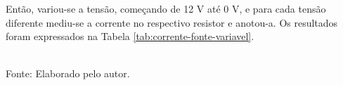 \documentclass[12pt]{article}
\begin{document}
Então, variou-se a tensão, começando de 12 V até 0 V, e para cada tensão diferente mediu-se a corrente no respectivo resistor e anotou-a. Os resultados foram expressados na Tabela \ref{tab:corrente-fonte-variavel}.

\begin{table}[H]
    \caption{Corrente que passa por cada resistor conforme tensão.}
    \label{tab:corrente-fonte-variavel}
    \centering
    \\
    \footnotesize{Fonte: Elaborado pelo autor.}
\end{table}
\end{document}
